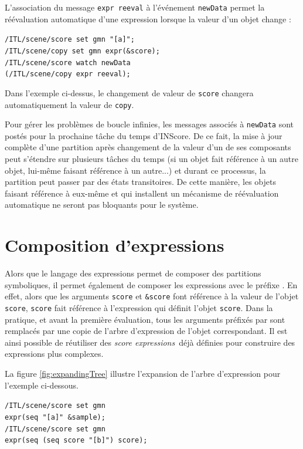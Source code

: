 \documentclass{article}
\newcommand{\OSC}[1]	{{\fontsize{10pt}{10pt} \selectfont\texttt{#1}}}
\newcommand{\oper}[1]	{\textcolor{figRed}{#1}}
\newcommand{\param}[1]	{\textcolor{figOrange}{#1}}
\newcommand{\prefix}[1]	{\textcolor{figBlue}{#1}}
\newcommand{\sExprs}{\emph{score expressions}}
\newcommand{\lowTilde}{\texttildelow}
\newcommand{\tab}{\hspace*{4mm}}
\newcommand{\sample}	[1]			{\vspace{-0.2em}\begin{center}\colorbox{mygrey}{\begin{minipage}[t]{0.97\columnwidth} {\small \texttt{#1}}\end{minipage}}\end{center}}
\begin{document}
L'association du message \OSC{expr reeval} à l'événement \OSC{newData} permet la réévaluation automatique d'une expression lorsque la valeur d'un objet change :
\sample{/ITL/scene/score set gmn "[a]";\\
/ITL/scene/copy set gmn expr(\&score);\\
/ITL/scene/score watch newData\\   
\hspace*{8mm}(/ITL/scene/copy expr reeval);
}

Dans l'exemple ci-dessus, le changement de valeur de \OSC{score} changera automatiquement la valeur de \OSC{copy}.

Pour gérer les problèmes de boucle infinies, les messages associés à \OSC{newData} sont postés pour la prochaine tâche du temps d'INScore. De ce fait, la mise à jour complète d'une partition après changement de la valeur d'un de ses composants peut s'étendre sur plusieurs tâches du temps (si un objet fait référence à un autre objet, lui-même faisant référence à un autre...) et durant ce processus, la partition peut passer par des états transitoires. De cette manière, les objets faisant référence à eux-même et qui installent un mécanisme de réévaluation automatique ne seront pas bloquants pour le système.


\section{Composition d'expressions}
\label{composingExpr}
Alors que le langage des expressions permet de composer des partitions symboliques, il permet également de composer les expressions avec le préfixe  \OSC{\prefix{\lowTilde}}. En effet, alors que les arguments \OSC{\param{score}} et \OSC{\prefix{\&}\param{score}} font référence à la valeur de l'objet \OSC{score}, \OSC{\prefix{\lowTilde}\param{score}} fait référence à l'expression qui définit l'objet \OSC{score}. Dans la pratique, et avant la première évaluation, tous les arguments préfixés par \OSC{\prefix{\lowTilde}} sont remplacés par une copie de l'arbre d'expression de l'objet correspondant. Il est ainsi possible de réutiliser des \sExprs\ déjà définies pour construire des expressions plus complexes.

La figure \ref{fig:expandingTree} illustre l'expansion de l'arbre d'expression pour l'exemple ci-dessous.

\sample{/ITL/scene/score set gmn\\
\tab expr(\oper{seq} \param{"[a]"} \prefix{\&}\param{sample});\\
/ITL/scene/score set gmn  \\
\tab expr(\oper{seq} (\oper{seq} \prefix{\lowTilde}\param{score} \param{"[b]"}) \prefix{\lowTilde}\param{score});
}
\end{document}
